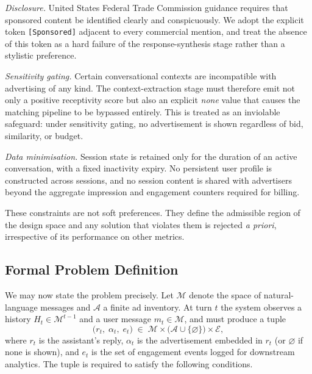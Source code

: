 \emph{Disclosure.} United States Federal Trade Commission guidance requires
that sponsored content be identified clearly and conspicuously. We adopt the
explicit token \texttt{[Sponsored]} adjacent to every commercial mention, and
treat the absence of this token as a hard failure of the response-synthesis
stage rather than a stylistic preference.

\emph{Sensitivity gating.} Certain conversational contexts are
incompatible with advertising of any kind. The context-extraction stage must
therefore emit not only a positive receptivity score but also an explicit
\emph{none} value that causes the matching pipeline to be bypassed entirely.
This is treated as an inviolable safeguard: under sensitivity gating, no
advertisement is shown regardless of bid, similarity, or budget.

\emph{Data minimisation.} Session state is retained only for the duration of
an active conversation, with a fixed inactivity expiry. No persistent user
profile is constructed across sessions, and no session content is shared with
advertisers beyond the aggregate impression and engagement counters required
for billing.

These constraints are not soft preferences. They define the admissible region
of the design space and any solution that violates them is rejected
\emph{a priori}, irrespective of its performance on other metrics.

\subsection{Formal Problem Definition}
\label{subsec:formal-problem}

We may now state the problem precisely. Let $\mathcal{M}$ denote the space of
natural-language messages and $\mathcal{A}$ a finite ad inventory. At turn $t$
the system observes a history $H_t \in \mathcal{M}^{t-1}$ and a user message
$m_t \in \mathcal{M}$, and must produce a tuple
\[
    \big(r_t,\; \alpha_t,\; e_t\big)
    \;\in\; \mathcal{M} \times \big(\mathcal{A} \cup \{\varnothing\}\big)
                       \times \mathcal{E},
\]
where $r_t$ is the assistant's reply, $\alpha_t$ is the advertisement embedded
in $r_t$ (or $\varnothing$ if none is shown), and $e_t$ is the set of
engagement events logged for downstream analytics. The tuple is required to
satisfy the following conditions.

